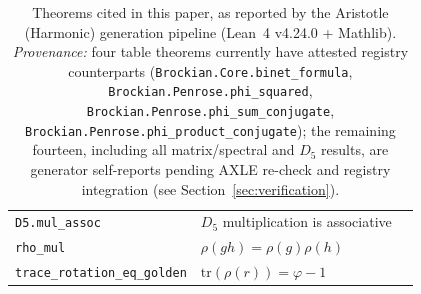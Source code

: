 \documentclass[11pt,a4paper]{article}
\newcommand{\lean}[1]{\texttt{\small #1}}
\newcommand{\verified}{\textcolor{green!60!black}{\checkmark}}
\begin{document}
\begin{table}[h]
\begin{tabular}{@{}lll@{}}
\lean{D5.mul\_assoc} & $D_5$ multiplication is associative & \verified \\
\lean{rho\_mul} & $\rho(gh) = \rho(g)\rho(h)$ & \verified \\
\lean{trace\_rotation\_eq\_golden} & $\mathrm{tr}(\rho(r)) = \varphi - 1$ & \verified \\
\bottomrule
\end{tabular}
\caption{Theorems cited in this paper, as reported by the Aristotle (Harmonic) generation pipeline (Lean~4 v4.24.0 + Mathlib). \emph{Provenance:} four table theorems currently have attested registry counterparts (\lean{Brockian.Core.binet\_formula}, \lean{Brockian.Penrose.phi\_squared}, \lean{Brockian.Penrose.phi\_sum\_conjugate}, \lean{Brockian.Penrose.phi\_product\_conjugate}); the remaining fourteen, including all matrix/spectral and $D_5$ results, are generator self-reports pending AXLE re-check and registry integration (see Section~\ref{sec:verification}).}
\label{tab:theorems}
\end{table}
\end{document}
